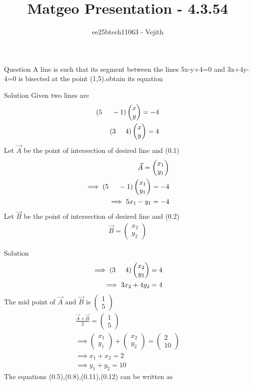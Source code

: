 \documentclass{beamer}
\title{Matgeo Presentation - 4.3.54}
\author{ee25btech11063 - Vejith}
\numberwithin{equation}{section}
\providecommand{\brak}[1]{\ensuremath{\left(#1\right)}}
\theoremstyle{remark}
\newcommand{\myvec}[1]{\ensuremath{\begin{pmatrix}#1\end{pmatrix}}}
\begin{document}
\frame{\titlepage}
\begin{frame}{Question}
A line is such that its segment between the lines 5x-y+4=0 and 3x+4y-4=0 is bisected at the point (1,5).obtain its equation
\end{frame}

\begin{frame}{Solution}
Given two lines are
\begin{align}
    \brak{5\hspace{0.5cm}-1}\myvec{x\\y}=-4\\
    \brak{3\hspace{0.5cm}4}\myvec{x\\y}=4
\end{align}
Let $\Vec{A}$ be the point of intersection of desired line and (0.1)
\begin{align}
    \Vec{A}=\myvec{x_1\\y_1}\\
    \implies \brak{5\hspace{0.5cm}-1}\myvec{x_1\\y_1}=-4\\
    \implies 5x_1-y_1=-4
\end{align}
Let $\Vec{B}$ be the point of intersection of desired line and (0.2)
\begin{align}
    \Vec{B}=\myvec{x_2\\y_2}
    \end{align}
    \end{frame}

    \begin{frame}{Solution}
\begin{align}
    \implies \brak{3\hspace{0.5cm}4}\myvec{x_2\\y_2}=4\\
    \implies 3x_2+4y_2=4
\end{align}
The mid point of $\Vec{A}$ and $\Vec{B}$ is $\myvec{1\\5}$
\begin{align}
  \frac{\Vec{A}+\Vec{B}}{2}=\myvec{1\\5}\\
  \implies \myvec{x_1\\y_1}+\myvec{x_2\\y_2}=\myvec{2\\10}\\
  \implies x_1+x_2=2\\
  \implies y_1+y_2=10
\end{align}
The equations (0.5),(0.8),(0.11),(0.12) can be written as
\end{frame}
\end{document}
